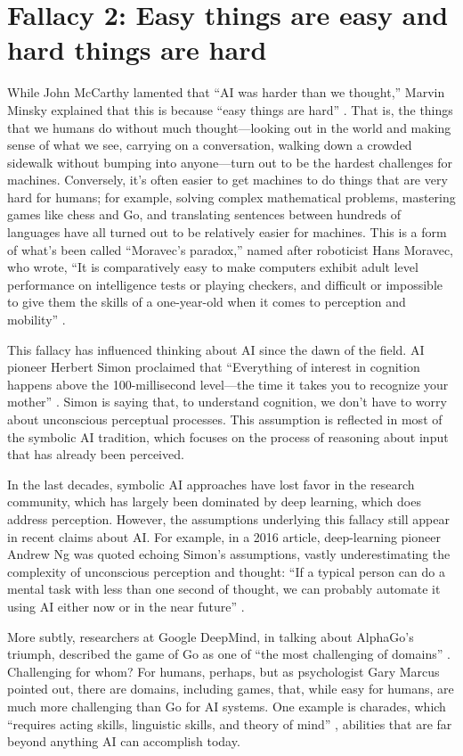 \documentclass[12pt]{article}
\begin{document}
\section*{Fallacy 2: Easy things are easy and hard things are hard}
While John McCarthy lamented that ``AI was harder than we thought,'' Marvin Minsky explained that this is because ``easy things are hard'' \cite{Minsky1987}.  That is, the things that we humans do without much thought---looking out in the world and making sense of what we see, carrying on a conversation, walking down a crowded sidewalk without bumping into anyone---turn out to be the hardest challenges for machines. Conversely, it's often easier to get machines to do things that are very hard for humans; for example, solving complex mathematical problems, mastering games like chess and Go, and translating sentences between hundreds of languages have all turned out to be relatively easier for machines.  This is a form of what's been called ``Moravec's paradox,'' named after roboticist Hans Moravec, who wrote, ``It is comparatively easy to make computers exhibit adult level performance on intelligence tests or playing checkers, and difficult or impossible to give them the skills of a one-year-old when it comes to perception and mobility'' \cite{Moravec1988a}.

This fallacy has influenced thinking about AI since the dawn of the field. AI pioneer Herbert Simon proclaimed that ``Everything of interest in cognition happens above the 100-millisecond level---the time it takes you to recognize your mother'' \cite{Hofstadter1985}.  Simon is saying that, to understand cognition, we don't have to worry about unconscious perceptual processes.  This assumption is reflected in most of the symbolic AI tradition, which focuses on the process of reasoning about input that has already been perceived. 

In the last decades, symbolic AI approaches have lost favor in the research community, which has largely been dominated by deep learning, which does address perception.  However, the assumptions underlying this fallacy still appear in recent claims about AI.  For example, in a 2016 article, deep-learning pioneer Andrew Ng was quoted echoing Simon's assumptions, vastly underestimating the complexity of unconscious perception and thought: ``If a typical person can do a mental task with less than one second of thought, we can probably automate it using AI either now or in the near future'' \cite{Ng2016}.

More subtly, researchers at Google DeepMind, in talking about AlphaGo's triumph, described the game of Go as one of ``the most challenging of domains'' \cite{Silver2017}.  Challenging for whom?  For humans, perhaps, but as psychologist Gary Marcus pointed out, there are domains, including games, that, while easy for humans, are much more challenging than Go for AI systems.  One example is charades, which ``requires acting skills, linguistic skills, and theory of mind'' \cite{Marcus2018}, abilities that are far beyond anything AI can accomplish today. 
\end{document}
